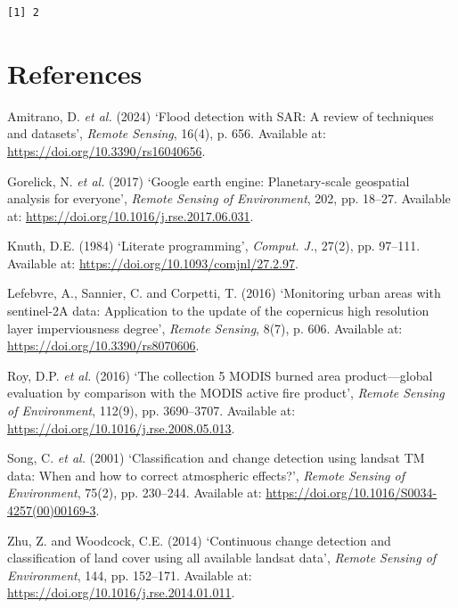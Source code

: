 \documentclass[
  letterpaper,
  DIV=11,
  numbers=noendperiod]{scrreprt}
\newlength{\cslhangindent}
\newenvironment{CSLReferences}[2] %
 {\begin{list}{}{%
  \setlength{\itemindent}{0pt}
  \setlength{\leftmargin}{0pt}
  \setlength{\parsep}{0pt}
  \ifodd #1
   \setlength{\leftmargin}{\cslhangindent}
   \setlength{\itemindent}{-1\cslhangindent}
  \fi
  \setlength{\itemsep}{#2\baselineskip}}}
 {\end{list}}
\begin{document}
\begin{verbatim}
[1] 2
\end{verbatim}


\chapter*{References}\label{references}


\label{refs}
\begin{CSLReferences}{0}{1}
Amitrano, D. \emph{et al.} (2024) {`Flood detection with SAR: A review
of techniques and datasets'}, \emph{Remote Sensing}, 16(4), p. 656.
Available at: \url{https://doi.org/10.3390/rs16040656}.

Gorelick, N. \emph{et al.} (2017) {`Google earth engine: Planetary-scale
geospatial analysis for everyone'}, \emph{Remote Sensing of
Environment}, 202, pp. 18--27. Available at:
\url{https://doi.org/10.1016/j.rse.2017.06.031}.

Knuth, D.E. (1984) {`Literate programming'}, \emph{Comput. J.}, 27(2),
pp. 97--111. Available at: \url{https://doi.org/10.1093/comjnl/27.2.97}.

Lefebvre, A., Sannier, C. and Corpetti, T. (2016) {`Monitoring urban
areas with sentinel-2A data: Application to the update of the copernicus
high resolution layer imperviousness degree'}, \emph{Remote Sensing},
8(7), p. 606. Available at: \url{https://doi.org/10.3390/rs8070606}.

Roy, D.P. \emph{et al.} (2016) {`The collection 5 MODIS burned area
product---global evaluation by comparison with the MODIS active fire
product'}, \emph{Remote Sensing of Environment}, 112(9), pp. 3690--3707.
Available at: \url{https://doi.org/10.1016/j.rse.2008.05.013}.

Song, C. \emph{et al.} (2001) {`Classification and change detection
using landsat TM data: When and how to correct atmospheric effects?'},
\emph{Remote Sensing of Environment}, 75(2), pp. 230--244. Available at:
\url{https://doi.org/10.1016/S0034-4257(00)00169-3}.

Zhu, Z. and Woodcock, C.E. (2014) {`Continuous change detection and
classification of land cover using all available landsat data'},
\emph{Remote Sensing of Environment}, 144, pp. 152--171. Available at:
\url{https://doi.org/10.1016/j.rse.2014.01.011}.

\end{CSLReferences}
\end{document}
